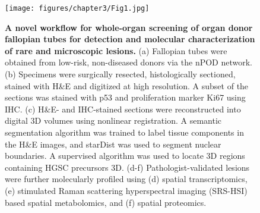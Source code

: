 \begin{refsection}
    \begin{figure}[h!]
        \begin{center}
            \texttt{[image: figures/chapter3/Fig1.jpg]}
            \caption{\textbf{A novel workflow for whole-organ screening of organ donor fallopian tubes for detection and molecular characterization of rare and microscopic lesions.} (a) Fallopian tubes were obtained from low-risk, non-diseased donors via the nPOD network. (b) Specimens were surgically resected, histologically sectioned, stained with H\&E and digitized at high resolution. A subset of the sections was stained with p53 and proliferation marker Ki67 using IHC. (c) H\&E- and IHC-stained sections were reconstructed into digital 3D volumes using nonlinear registration. A semantic segmentation algorithm was trained to label tissue components in the H\&E images, and starDist was used to segment nuclear boundaries. A supervised algorithm was used to locate 3D regions containing HGSC precursors 3D. (d-f) Pathologist-validated lesions were further molecularly profiled using (d) spatial transcriptomics, (e) stimulated Raman scattering hyperspectral imaging (SRS-HSI) based spatial metabolomics, and (f) spatial proteomics.}
            \label{chapter3_fig1}
        \end{center}
    \end{figure}
    

\end{refsection}
